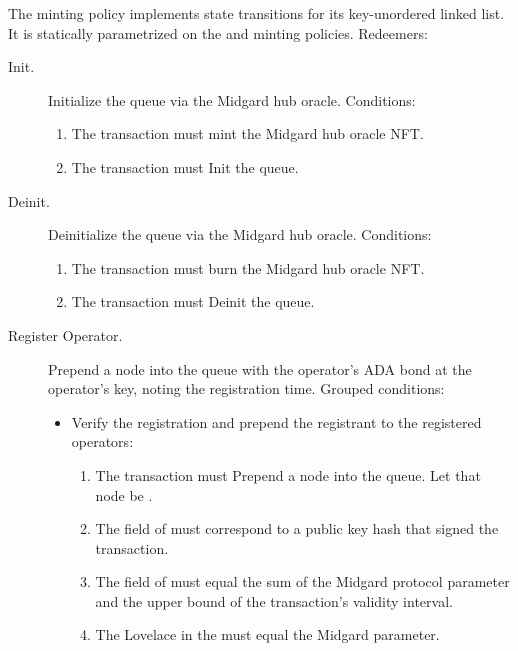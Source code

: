 \documentclass[../midgard.tex]{subfiles}
\begin{document}
The  minting policy implements state transitions for its key-unordered linked list.
It is statically parametrized on the  and  minting policies.
Redeemers:
\begin{description}
    \item[Init.] Initialize the  queue via the Midgard hub oracle.
      Conditions:
        \begin{enumerate}
            \item The transaction must mint the Midgard hub oracle NFT.
            \item The transaction must Init the  queue.
        \end{enumerate}
    \item[Deinit.] Deinitialize the  queue via the Midgard hub oracle.
      Conditions:
        \begin{enumerate}
            \item The transaction must burn the Midgard hub oracle NFT.
            \item The transaction must Deinit the  queue.
        \end{enumerate}
    \item[Register Operator.] Prepend a node into the  queue with the operator's ADA bond at the operator's key, noting the registration time.
      Grouped conditions:
        \begin{itemize}
            \item Verify the registration and prepend the registrant to the registered operators:
            \begin{enumerate}
                \item The transaction must Prepend a node into the  queue.
                  Let that node be .
                \item The  field of  must correspond to a public key hash that signed the transaction.
                \item The  field of  must equal the sum of the Midgard  protocol parameter and the upper bound of the transaction's validity interval.
                \item The Lovelace in the  must equal the  Midgard parameter.

\end{enumerate}
\end{itemize}
\end{description}
\end{document}
